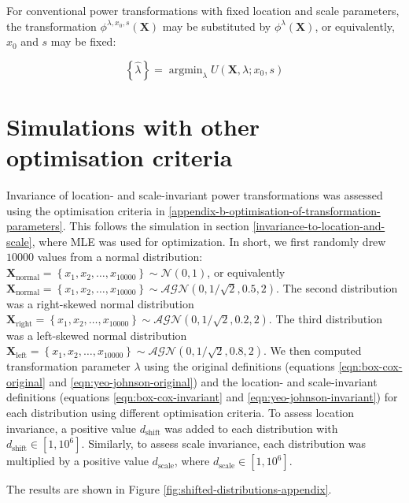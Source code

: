 \documentclass[preprint,12pt,authoryear]{elsarticle}
\DeclareMathOperator*{\argmin}{argmin}
\begin{document}
For conventional power transformations with fixed location and scale
parameters, the transformation \(\phi^{\lambda, x_0, s} (\mathbf{X})\)
may be substituted by \(\phi^{\lambda} (\mathbf{X})\), or equivalently,
\(x_0\) and \(s\) may be fixed:

\begin{equation}
\left\{ \hat{\lambda}\right\} = \argmin_{\lambda} U\left(\mathbf{X}, \lambda; x_0, s \right)
\end{equation}

\section{Simulations with other optimisation criteria}\label{appendix-c-simulations-with-other-optimisation-criteria}

Invariance of location- and scale-invariant power transformations was
assessed using the optimisation criteria in 
\ref{appendix-b-optimisation-of-transformation-parameters}. This follows the simulation in section \ref{invariance-to-location-and-scale}, where MLE was
used for optimization. In short, we first randomly drew \(10000\) values
from a normal distribution:
\(\mathbf{X}_{\text{normal}} = \left\{x_1, x_2, \ldots, x_{10000} \right\} \sim \mathcal{N}\left(0, 1\right)\),
or equivalently
\(\mathbf{X}_{\text{normal}} = \left\{x_1, x_2, \ldots, x_{10000} \right\} \sim \mathcal{AGN}\left(0, 1/\sqrt{2}, 0.5, 2\right)\).
The second distribution was a right-skewed normal distribution
\(\mathbf{X}_{\text{right}} = \left\{x_1, x_2, \ldots, x_{10000} \right\} \sim \mathcal{AGN}\left(0, 1/\sqrt{2}, 0.2, 2\right)\).
The third distribution was a left-skewed normal distribution
\(\mathbf{X}_{\text{left}} = \left\{x_1, x_2, \ldots, x_{10000} \right\} \sim \mathcal{AGN}\left(0, 1/\sqrt{2}, 0.8, 2\right)\).
We then computed transformation parameter \(\lambda\) using the original
definitions (equations \ref{eqn:box-cox-original} and
\ref{eqn:yeo-johnson-original}) and the location- and scale-invariant
definitions (equations \ref{eqn:box-cox-invariant} and
\ref{eqn:yeo-johnson-invariant}) for each distribution using different
optimisation criteria. To assess location invariance, a positive value
\(d_{\text{shift}}\) was added to each distribution with
\(d_{\text{shift}} \in [1, 10^6]\). Similarly, to assess scale
invariance, each distribution was multiplied by a positive value
\(d_{\text{scale}}\), where \(d_{\text{scale}} \in [1, 10^6]\).

The results are shown in Figure
\ref{fig:shifted-distributions-appendix}.
\end{document}
